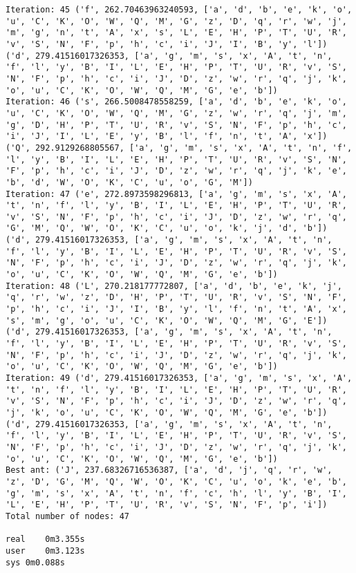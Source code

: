 \documentclass[english,man]{apa6}
\begin{document}
\begin{verbatim}
Iteration: 45 ('f', 262.70463963240593, ['a', 'd', 'b', 'e', 'k', 'o', 'u', 'C', 'K', 'O', 'W', 'Q', 'M', 'G', 'z', 'D', 'q', 'r', 'w', 'j', 'm', 'g', 'n', 't', 'A', 'x', 's', 'L', 'E', 'H', 'P', 'T', 'U', 'R', 'v', 'S', 'N', 'F', 'p', 'h', 'c', 'i', 'J', 'I', 'B', 'y', 'l']) ('d', 279.41516017326353, ['a', 'g', 'm', 's', 'x', 'A', 't', 'n', 'f', 'l', 'y', 'B', 'I', 'L', 'E', 'H', 'P', 'T', 'U', 'R', 'v', 'S', 'N', 'F', 'p', 'h', 'c', 'i', 'J', 'D', 'z', 'w', 'r', 'q', 'j', 'k', 'o', 'u', 'C', 'K', 'O', 'W', 'Q', 'M', 'G', 'e', 'b'])
Iteration: 46 ('s', 266.5008478558259, ['a', 'd', 'b', 'e', 'k', 'o', 'u', 'C', 'K', 'O', 'W', 'Q', 'M', 'G', 'z', 'w', 'r', 'q', 'j', 'm', 'g', 'D', 'H', 'P', 'T', 'U', 'R', 'v', 'S', 'N', 'F', 'p', 'h', 'c', 'i', 'J', 'I', 'L', 'E', 'y', 'B', 'l', 'f', 'n', 't', 'A', 'x']) ('Q', 292.9129268805567, ['a', 'g', 'm', 's', 'x', 'A', 't', 'n', 'f', 'l', 'y', 'B', 'I', 'L', 'E', 'H', 'P', 'T', 'U', 'R', 'v', 'S', 'N', 'F', 'p', 'h', 'c', 'i', 'J', 'D', 'z', 'w', 'r', 'q', 'j', 'k', 'e', 'b', 'd', 'W', 'O', 'K', 'C', 'u', 'o', 'G', 'M'])
Iteration: 47 ('e', 272.8973598296813, ['a', 'g', 'm', 's', 'x', 'A', 't', 'n', 'f', 'l', 'y', 'B', 'I', 'L', 'E', 'H', 'P', 'T', 'U', 'R', 'v', 'S', 'N', 'F', 'p', 'h', 'c', 'i', 'J', 'D', 'z', 'w', 'r', 'q', 'G', 'M', 'Q', 'W', 'O', 'K', 'C', 'u', 'o', 'k', 'j', 'd', 'b']) ('d', 279.41516017326353, ['a', 'g', 'm', 's', 'x', 'A', 't', 'n', 'f', 'l', 'y', 'B', 'I', 'L', 'E', 'H', 'P', 'T', 'U', 'R', 'v', 'S', 'N', 'F', 'p', 'h', 'c', 'i', 'J', 'D', 'z', 'w', 'r', 'q', 'j', 'k', 'o', 'u', 'C', 'K', 'O', 'W', 'Q', 'M', 'G', 'e', 'b'])
Iteration: 48 ('L', 270.218177772807, ['a', 'd', 'b', 'e', 'k', 'j', 'q', 'r', 'w', 'z', 'D', 'H', 'P', 'T', 'U', 'R', 'v', 'S', 'N', 'F', 'p', 'h', 'c', 'i', 'J', 'I', 'B', 'y', 'l', 'f', 'n', 't', 'A', 'x', 's', 'm', 'g', 'o', 'u', 'C', 'K', 'O', 'W', 'Q', 'M', 'G', 'E']) ('d', 279.41516017326353, ['a', 'g', 'm', 's', 'x', 'A', 't', 'n', 'f', 'l', 'y', 'B', 'I', 'L', 'E', 'H', 'P', 'T', 'U', 'R', 'v', 'S', 'N', 'F', 'p', 'h', 'c', 'i', 'J', 'D', 'z', 'w', 'r', 'q', 'j', 'k', 'o', 'u', 'C', 'K', 'O', 'W', 'Q', 'M', 'G', 'e', 'b'])
Iteration: 49 ('d', 279.41516017326353, ['a', 'g', 'm', 's', 'x', 'A', 't', 'n', 'f', 'l', 'y', 'B', 'I', 'L', 'E', 'H', 'P', 'T', 'U', 'R', 'v', 'S', 'N', 'F', 'p', 'h', 'c', 'i', 'J', 'D', 'z', 'w', 'r', 'q', 'j', 'k', 'o', 'u', 'C', 'K', 'O', 'W', 'Q', 'M', 'G', 'e', 'b']) ('d', 279.41516017326353, ['a', 'g', 'm', 's', 'x', 'A', 't', 'n', 'f', 'l', 'y', 'B', 'I', 'L', 'E', 'H', 'P', 'T', 'U', 'R', 'v', 'S', 'N', 'F', 'p', 'h', 'c', 'i', 'J', 'D', 'z', 'w', 'r', 'q', 'j', 'k', 'o', 'u', 'C', 'K', 'O', 'W', 'Q', 'M', 'G', 'e', 'b'])
Best ant: ('J', 237.68326716536387, ['a', 'd', 'j', 'q', 'r', 'w', 'z', 'D', 'G', 'M', 'Q', 'W', 'O', 'K', 'C', 'u', 'o', 'k', 'e', 'b', 'g', 'm', 's', 'x', 'A', 't', 'n', 'f', 'c', 'h', 'l', 'y', 'B', 'I', 'L', 'E', 'H', 'P', 'T', 'U', 'R', 'v', 'S', 'N', 'F', 'p', 'i'])
Total number of nodes: 47

real    0m3.355s
user    0m3.123s
sys 0m0.088s
\end{verbatim}
\end{document}
